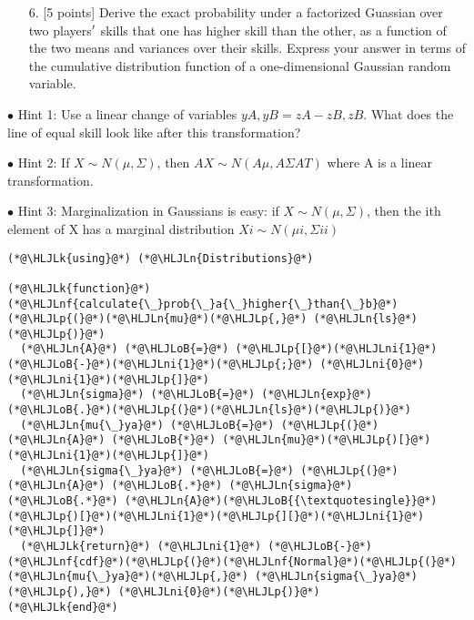 \documentclass[12pt,a4paper]{article}
\newcommand{\HLJLk}[1]{\textcolor[RGB]{148,91,176}{\textbf{#1}}}
\newcommand{\HLJLn}[1]{#1}
\newcommand{\HLJLnf}[1]{\textcolor[RGB]{66,102,213}{#1}}
\newcommand{\HLJLni}[1]{\textcolor[RGB]{59,151,46}{#1}}
\newcommand{\HLJLoB}[1]{\textcolor[RGB]{102,102,102}{\textbf{#1}}}
\newcommand{\HLJLp}[1]{#1}
\begin{document}
\begin{itemize}
\item[6. ] [5 points] Derive the exact probability under a factorized Guassian over two players\ensuremath{\rq} skills that one has higher skill than the other, as a function of the two means and variances over their skills. Express your answer in terms of the cumulative distribution function of a one-dimensional Gaussian random variable.

\end{itemize}
\ensuremath{\bullet} Hint 1: Use a linear change of variables $yA,yB = zA - zB,zB$. What does the line of equal skill look like after this transformation?

\ensuremath{\bullet} Hint 2: If $X \ensuremath{\sim} N (\ensuremath{\mu}, \ensuremath{\Sigma})$, then $AX \ensuremath{\sim} N (A\ensuremath{\mu}, A\ensuremath{\Sigma}AT )$ where A is a linear transformation.

\ensuremath{\bullet} Hint 3: Marginalization in Gaussians is easy: if $X \ensuremath{\sim} N (\ensuremath{\mu}, \ensuremath{\Sigma})$, then the ith element of X has a marginal distribution $Xi \ensuremath{\sim} N(\ensuremath{\mu}i,\ensuremath{\Sigma}ii)$


\begin{lstlisting}
(*@\HLJLk{using}@*) (*@\HLJLn{Distributions}@*)

(*@\HLJLk{function}@*) (*@\HLJLnf{calculate{\_}prob{\_}a{\_}higher{\_}than{\_}b}@*)(*@\HLJLp{(}@*)(*@\HLJLn{mu}@*)(*@\HLJLp{,}@*) (*@\HLJLn{ls}@*)(*@\HLJLp{)}@*)
  (*@\HLJLn{A}@*) (*@\HLJLoB{=}@*) (*@\HLJLp{[}@*)(*@\HLJLni{1}@*) (*@\HLJLoB{-}@*)(*@\HLJLni{1}@*)(*@\HLJLp{;}@*) (*@\HLJLni{0}@*) (*@\HLJLni{1}@*)(*@\HLJLp{]}@*)
  (*@\HLJLn{sigma}@*) (*@\HLJLoB{=}@*) (*@\HLJLn{exp}@*)(*@\HLJLoB{.}@*)(*@\HLJLp{(}@*)(*@\HLJLn{ls}@*)(*@\HLJLp{)}@*)
  (*@\HLJLn{mu{\_}ya}@*) (*@\HLJLoB{=}@*) (*@\HLJLp{(}@*)(*@\HLJLn{A}@*) (*@\HLJLoB{*}@*) (*@\HLJLn{mu}@*)(*@\HLJLp{)[}@*)(*@\HLJLni{1}@*)(*@\HLJLp{]}@*)
  (*@\HLJLn{sigma{\_}ya}@*) (*@\HLJLoB{=}@*) (*@\HLJLp{(}@*)(*@\HLJLn{A}@*) (*@\HLJLoB{.*}@*) (*@\HLJLn{sigma}@*) (*@\HLJLoB{.*}@*) (*@\HLJLn{A}@*)(*@\HLJLoB{{\textquotesingle}}@*)(*@\HLJLp{)[}@*)(*@\HLJLni{1}@*)(*@\HLJLp{][}@*)(*@\HLJLni{1}@*)(*@\HLJLp{]}@*)
  (*@\HLJLk{return}@*) (*@\HLJLni{1}@*) (*@\HLJLoB{-}@*) (*@\HLJLnf{cdf}@*)(*@\HLJLp{(}@*)(*@\HLJLnf{Normal}@*)(*@\HLJLp{(}@*)(*@\HLJLn{mu{\_}ya}@*)(*@\HLJLp{,}@*) (*@\HLJLn{sigma{\_}ya}@*)(*@\HLJLp{),}@*) (*@\HLJLni{0}@*)(*@\HLJLp{)}@*)
(*@\HLJLk{end}@*)
\end{lstlisting}
\end{document}
